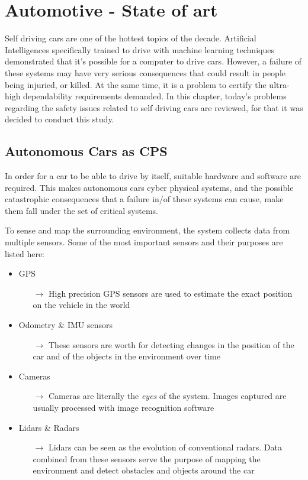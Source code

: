 \chapter{Automotive - State of art}

Self driving cars are one of the hottest topics of the decade. Artificial Intelligences specifically trained to drive with machine learning techniques demonstrated that it's possible for a computer to drive cars. However, a failure of these systems may have very serious consequences that could result in people being injuried, or killed. At the same time, it is a problem to certify the ultra-high dependability requirements demanded. In this chapter, today's problems regarding the safety issues related to self driving cars are reviewed, for that it was decided to conduct this study.

\section{Autonomous Cars as CPS}

In order for a car to be able to drive by itself, suitable hardware and software are required. This makes autonomous cars cyber physical systems, and the possible catastrophic consequences that a failure in/of these systems can cause, make them fall under the set of critical systems.

To sense and map the surrounding environment, the system collects data from multiple sensors. Some of the most important sensors and their purposes are listed here:

\begin{itemize}
	\item GPS
	\begin{itemize}
		\item[$\rightarrow$] High precision GPS sensors are used to estimate the exact position on the vehicle in the world
	\end{itemize}
	\item Odometry \& IMU sensors
	\begin{itemize}
		\item[$\rightarrow$] These sensors are worth for detecting changes in the position of the car and of the objects in the environment over time
	\end{itemize}
	\item Cameras
	\begin{itemize}
		\item[$\rightarrow$] Cameras are literally the \textsl{eyes} of the system. Images captured are usually processed with image recognition software
	\end{itemize}
	\item Lidars \& Radars
	\begin{itemize}
		\item[$\rightarrow$] Lidars can be seen as the evolution of conventional radars. Data combined from these sensors serve the purpose of mapping the environment and detect obstacles and objects around the car
	\end{itemize}
\end{itemize}

